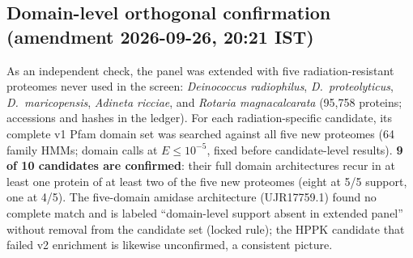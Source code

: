 \documentclass[12pt,a4paper]{article}
\begin{document}
\subsection{Domain-level orthogonal confirmation (amendment 2026-09-26, 20:21 IST)}
As an independent check, the panel was extended with five radiation-resistant proteomes never used in the screen: \emph{Deinococcus radiophilus}, \emph{D.~proteolyticus}, \emph{D.~maricopensis}, \emph{Adineta ricciae}, and \emph{Rotaria magnacalcarata} (95,758 proteins; accessions and hashes in the ledger). For each radiation-specific candidate, its complete v1 Pfam domain set was searched against all five new proteomes (64 family HMMs; domain calls at $E\le 10^{-5}$, fixed before candidate-level results). \textbf{9 of 10 candidates are confirmed}: their full domain architectures recur in at least one protein of at least two of the five new proteomes (eight at 5/5 support, one at 4/5). The five-domain amidase architecture (UJR17759.1) found no complete match and is labeled ``domain-level support absent in extended panel'' without removal from the candidate set (locked rule); the HPPK candidate that failed v2 enrichment is likewise unconfirmed, a consistent picture.
\end{document}
